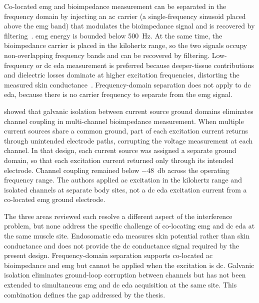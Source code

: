 Co-located \gls{emg} and bioimpedance measurement can be separated in the frequency domain by injecting an \gls{ac} carrier (a single-frequency sinusoid placed above the \gls{emg} band) that modulates the bioimpedance signal and is recovered by filtering~\cite{ngo_wearable_2022}. \gls{emg} energy is bounded below \SI{500}{\hertz}. At the same time, the bioimpedance carrier is placed in the kilohertz range, so the two signals occupy non-overlapping frequency bands and can be recovered by filtering. Low-frequency or \gls{dc} \gls{eda} measurement is preferred because deeper-tissue contributions and dielectric losses dominate at higher excitation frequencies, distorting the measured skin conductance~\cite{martinsen_sources_2015}. Frequency-domain separation does not apply to \gls{dc} \gls{eda}, because there is no carrier frequency to separate from the \gls{emg} signal.

\textcite{kusche_galvanically_2017} showed that galvanic isolation between current source ground domains eliminates channel coupling in multi-channel bioimpedance measurement. When multiple current sources share a common ground, part of each excitation current returns through unintended electrode paths, corrupting the voltage measurement at each channel. In that design, each current source was assigned a separate ground domain, so that each excitation current returned only through its intended electrode. Channel coupling remained below \SI{-48}{\decibel} across the operating frequency range. The authors applied \gls{ac} excitation in the kilohertz range and isolated channels at separate body sites, not a \gls{dc} \gls{eda} excitation current from a co-located \gls{emg} ground electrode.

The three areas reviewed each resolve a different aspect of the interference problem, but none address the specific challenge of co-locating \gls{emg} and \gls{dc} \gls{eda} at the same muscle site. Endosomatic \gls{eda} measures skin potential rather than skin conductance and does not provide the \gls{dc} conductance signal required by the present design. Frequency-domain separation supports co-located \gls{ac} bioimpedance and \gls{emg} but cannot be applied when the excitation is \gls{dc}. Galvanic isolation eliminates ground-loop corruption between channels but has not been extended to simultaneous \gls{emg} and \gls{dc} \gls{eda} acquisition at the same site. This combination defines the gap addressed by the thesis.

